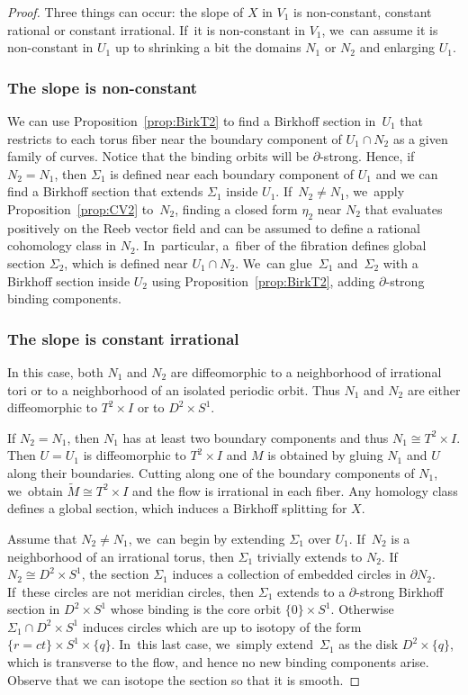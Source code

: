 \documentclass[10pt]{amsart}
\theoremstyle{definition}
\begin{document}
\begin{proof}
Three things can occur: the slope of $X$ in $V_1$ is non-constant, constant rational or constant irrational. If~it is non-constant in $V_1$, we~can assume it is non-constant in $U_1$ up to shrinking a bit the domains $N_1$ or $N_2$ and enlarging $U_1$.

\subsubsection*{The slope is non-constant} We can use Proposition~\ref{prop:BirkT2} to find a Birkhoff section in~$U_1$ that restricts to each torus fiber near the boundary component of $U_1\cap N_2$ as a given family of curves. Notice that the binding orbits will be $\partial$-strong. Hence, if~$N_2=N_1$, then $\Sigma_1$ is defined near each boundary component of $U_1$ and we can find a Birkhoff section that extends $\Sigma_1$ inside $U_1$. If~$N_2\neq N_1$, we~apply Proposition~\ref{prop:CV2} to~$N_2$, finding a closed form $\eta_2$ near $N_2$ that evaluates positively on the Reeb vector field and can be assumed to define a rational cohomology class in $N_2$. In~particular, a~fiber of the fibration defines global section $\Sigma_2$, which is defined near $U_1\cap N_2$. We~can glue~$\Sigma_1$ and~$\Sigma_2$ with a Birkhoff section inside $U_2$ using Proposition~\ref{prop:BirkT2}, adding $\partial$-strong binding components.

\subsubsection*{The slope is constant irrational}
In this case, both $N_1$ and $N_2$ are diffeomorphic to a neighborhood of irrational tori or to a neighborhood of an isolated periodic orbit. Thus $N_1$ and $N_2$ are either diffeomorphic to $T^2\times I$ or to $D^2\times S^1$.

If $N_2=N_1$, then $N_1$ has at least two boundary components and thus $N_1\cong T^2\times I$. Then $U=U_1$ is diffeomorphic to $T^2\times I$ and $M$ is obtained by gluing $N_1$ and $U$ along their boundaries. Cutting along one of the boundary components of $N_1$, we~obtain $\widetilde{M}\cong T^2\times I$ and the flow is irrational in each fiber. Any homology class defines a global section, which induces a Birkhoff splitting for $X$.

Assume that $N_2\neq N_1$, we~can begin by extending $\Sigma_1$ over $U_1$. If~$N_2$ is a neighborhood of an irrational torus, then $\Sigma_1$ trivially extends to $N_2$.
If $N_2\cong D^2\times S^1$, the section $\Sigma_1$ induces a collection of embedded circles in $\partial N_2$. If~these circles are not meridian circles, then $\Sigma_1$ extends to a $\partial$-strong Birkhoff section in $D^2\times S^1$ whose binding is the core orbit $\{0\}\times S^1$. Otherwise $\Sigma_1\cap D^2\times S^1$ induces circles which are up to isotopy of the form $\{r=ct\}\times S^1 \times \{q\}$. In~this last case, we~simply extend~$\Sigma_1$ as the disk $D^2\times \{q\}$, which is transverse to the flow, and hence no new binding components arise. Observe that we can isotope the section so that it is smooth.


\end{proof}
\end{document}
